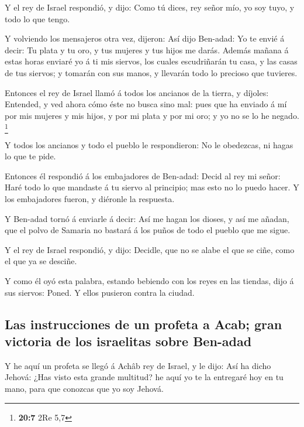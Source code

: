  Y el rey de Israel respondió, y dijo: Como tú dices, rey
señor mío, yo soy tuyo, y todo lo que tengo.

 Y volviendo los mensajeros otra vez, dijeron: Así dijo
Ben-adad: Yo te envié á decir: Tu plata y tu oro, y tus mujeres y tus
hijos me darás.  Además mañana á estas horas enviaré yo á ti
mis siervos, los cuales escudriñarán tu casa, y las casas de tus
siervos; y tomarán con sus manos, y llevarán todo lo precioso que
tuvieres.

 Entonces el rey de Israel llamó á todos los ancianos de la
tierra, y díjoles: Entended, y ved ahora cómo éste no busca sino mal:
pues que ha enviado á mí por mis mujeres y mis hijos, y por mi plata y
por mi oro; y yo no se lo he negado. \footnote{\textbf{20:7} 2Re 5,7}

 Y todos los ancianos y todo el pueblo le respondieron: No
le obedezcas, ni hagas lo que te pide.

 Entonces él respondió á los embajadores de Ben-adad: Decid
al rey mi señor: Haré todo lo que mandaste á tu siervo al principio; mas
esto no lo puedo hacer. Y los embajadores fueron, y diéronle la
respuesta.

 Y Ben-adad tornó á enviarle á decir: Así me hagan los
dioses, y así me añadan, que el polvo de Samaria no bastará á los puños
de todo el pueblo que me sigue.

 Y el rey de Israel respondió, y dijo: Decidle, que no se
alabe el que se ciñe, como el que ya se desciñe.

 Y como él oyó esta palabra, estando bebiendo con los reyes
en las tiendas, dijo á sus siervos: Poned. Y ellos pusieron contra la
ciudad.

\hypertarget{las-instrucciones-de-un-profeta-a-acab-gran-victoria-de-los-israelitas-sobre-ben-adad}{%
\subsection{Las instrucciones de un profeta a Acab; gran victoria de los
israelitas sobre
Ben-adad}\label{las-instrucciones-de-un-profeta-a-acab-gran-victoria-de-los-israelitas-sobre-ben-adad}}

 Y he aquí un profeta se llegó á Achâb rey de Israel, y le
dijo: Así ha dicho Jehová: ¿Has visto esta grande multitud? he aquí yo
te la entregaré hoy en tu mano, para que conozcas que yo soy Jehová.

